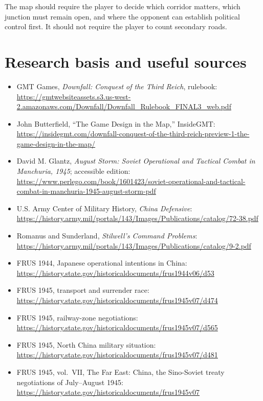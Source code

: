 \documentclass[11pt]{article}
\begin{document}
The map should require the player to decide which corridor matters, which junction must remain open, and where the opponent can establish political control first. It should not require the player to count secondary roads.

\section{Research basis and useful sources}\label{sec:sources}
\begin{itemize}
\item GMT Games, \emph{Downfall: Conquest of the Third Reich}, rulebook: \url{https://gmtwebsiteassets.s3.us-west-2.amazonaws.com/Downfall/Downfall_Rulebook_FINAL3_web.pdf}
\item John Butterfield, ``The Game Design in the Map,'' InsideGMT: \url{https://insidegmt.com/downfall-conquest-of-the-third-reich-preview-1-the-game-design-in-the-map/}
\item David M. Glantz, \emph{August Storm: Soviet Operational and Tactical Combat in Manchuria, 1945}; accessible edition: \url{https://www.perlego.com/book/1601423/soviet-operational-and-tactical-combat-in-manchuria-1945-august-storm-pdf}
\item U.S. Army Center of Military History, \emph{China Defensive}: \url{https://history.army.mil/portals/143/Images/Publications/catalog/72-38.pdf}
\item Romanus and Sunderland, \emph{Stilwell's Command Problems}: \url{https://history.army.mil/portals/143/Images/Publications/catalog/9-2.pdf}
\item FRUS 1944, Japanese operational intentions in China: \url{https://history.state.gov/historicaldocuments/frus1944v06/d53}
\item FRUS 1945, transport and surrender race: \url{https://history.state.gov/historicaldocuments/frus1945v07/d474}
\item FRUS 1945, railway-zone negotiations: \url{https://history.state.gov/historicaldocuments/frus1945v07/d565}
\item FRUS 1945, North China military situation: \url{https://history.state.gov/historicaldocuments/frus1945v07/d481}
\item FRUS 1945, vol.~VII, The Far East: China, the Sino-Soviet treaty negotiations of July--August 1945: \url{https://history.state.gov/historicaldocuments/frus1945v07}
\end{itemize}
\end{document}
